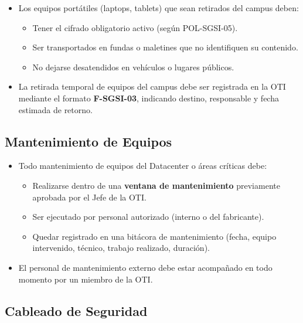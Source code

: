 \documentclass[10pt,letterpaper]{article}
\begin{document}
\begin{itemize}
\tightlist
\item
  Los equipos portátiles (laptops, tablets) que sean retirados del
  campus deben:

  \begin{itemize}
  \tightlist
  \item
    Tener el cifrado obligatorio activo (según POL-SGSI-05).
  \item
    Ser transportados en fundas o maletines que no identifiquen su
    contenido.
  \item
    No dejarse desatendidos en vehículos o lugares públicos.
  \end{itemize}
\item
  La retirada temporal de equipos del campus debe ser registrada en la
  OTI mediante el formato \textbf{F-SGSI-03}, indicando destino,
  responsable y fecha estimada de retorno.
\end{itemize}

\subsection{Mantenimiento de Equipos}\label{mantenimiento-de-equipos}

\begin{itemize}
\tightlist
\item
  Todo mantenimiento de equipos del Datacenter o áreas críticas debe:

  \begin{itemize}
  \tightlist
  \item
    Realizarse dentro de una \textbf{ventana de mantenimiento}
    previamente aprobada por el Jefe de la OTI.
  \item
    Ser ejecutado por personal autorizado (interno o del fabricante).
  \item
    Quedar registrado en una bitácora de mantenimiento (fecha, equipo
    intervenido, técnico, trabajo realizado, duración).
  \end{itemize}
\item
  El personal de mantenimiento externo debe estar acompañado en todo
  momento por un miembro de la OTI.
\end{itemize}

\subsection{Cableado de Seguridad}\label{cableado-de-seguridad}
\end{document}
